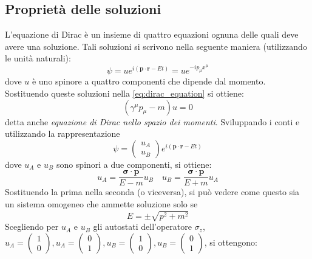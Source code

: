 \documentclass{subnucbo}
\begin{document}
\subsection{Proprietà delle soluzioni}
L'equazione di Dirac è un insieme di quattro equazioni ognuna delle quali deve avere una soluzione.
Tali soluzioni si scrivono nella seguente maniera (utilizzando le unità naturali):
\begin{equation}
        \psi = u e ^ { i ( \mathbf { p } \cdot \mathbf { r } - E t ) } = u e ^ { - i p _ { \mu } x ^ { \mu } }
        \label{eq:dirac_sol}
\end{equation}
dove $u$ è uno spinore a quattro componenti che dipende dal momento. Sostituendo queste soluzioni nella \ref{eq:dirac_equation} si ottiene:
\begin{equation}
        \left( \gamma ^ { \mu } p _ { \mu } - m \right) u = 0
        \label{eq:dirac_eq_momentum}
\end{equation}
detta anche \textit{equazione di Dirac nello spazio dei momenti}. Sviluppando i conti e utilizzando la rappresentazione
\begin{equation}
        \psi = \left( \begin{array} { l } { u_{A} } \\ { u_{B} } \end{array} \right) e ^ { i ( \mathbf { p } \cdot \mathbf { r } - E t ) }
        \label{eq:dirac_sol_spinors}
\end{equation}
dove $u_{A}$ e $u_{B}$ sono spinori a due componenti, si ottiene:
\begin{equation}
        u _ { A } = \frac { \boldsymbol { \sigma } \cdot \mathbf { p } } { E - m } u _ { B } \quad u _ { B } = \frac { \boldsymbol { \sigma } \cdot \mathbf { p } } { E + m } u _ { A }
\end{equation}
Sostituendo la prima nella seconda (o viceversa), si può vedere come questo sia un sistema omogeneo che ammette soluzione solo se
\begin{equation}
        E = \pm \sqrt { p ^ { 2 } + m ^ { 2 } }
        \label{eq:energy}
\end{equation}
Scegliendo per $u_{A}$ e $u_{B}$ gli autostati dell'operatore $\sigma_{z}$, $u _ { A } = \left( \begin{array} { c } { 1 } \\ { 0 } \end{array} \right) , u _ { A } = \left( \begin{array} { l } { 0 } \\ { 1 } \end{array} \right), u _ { B } = \left( \begin{array} { c } { 1 } \\ { 0 } \end{array} \right) , u _ { B } = \left( \begin{array} { l } { 0 } \\ { 1 } \end{array} \right)$, si ottengono:
\end{document}

